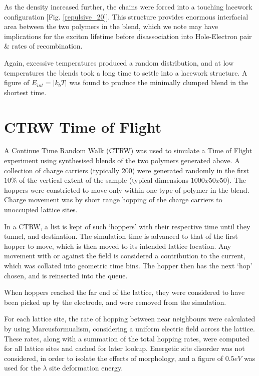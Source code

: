 \documentclass[twocolumn,a4,notitlepage]{article}
\begin{document}
As the density increased further, the chains were forced into a touching
lacework configuration [Fig. \ref{repulsive_20}]. 
This structure provides enormous interfacial area between the two
polymers in the blend, which we note may have implications for the exciton
lifetime before disassociation into Hole-Electron pair \& rates of
recombination.

Again, excessive temperatures produced a random distribution, and at low
temperatures the blends took a long time to settle into a lacework
structure. A figure of $E_{int} = |k_b T|$ was found to produce the minimally
clumped blend in the shortest time.

\section{CTRW Time of Flight}

A Continue Time Random Walk (CTRW) was used to simulate a Time of Flight
experiment using synthesised blends of the two polymers generated above. A
collection of charge carriers (typically 200) were generated randomly in the first $10\%$ of
the vertical extent of the sample (typical dimensions $1000x50x50$). The
hoppers were constricted to move only within one type of polymer in the
blend. Charge movement was by short range hopping of the charge carriers to
unoccupied lattice sites.

In a CTRW, a list is kept of such `hoppers' with their respective time until they
tunnel, and destination. The simulation time is advanced to that of the
first hopper to move, which is then moved to its intended lattice location.
Any movement with or against the field is considered a contribution to the
current, which was collated into geometric time bins. The hopper then has
the next `hop' chosen, and is reinserted into the queue.

When hoppers reached the far end of the lattice, they were considered to
have been picked up by the electrode, and were removed from the simulation.

For each lattice site, the rate of hopping between near neighbours were
calculated by using Marcusformualism, considering a uniform electric
field across the lattice. These rates, along with a
summation of the total hopping rates, were computed for all lattice sites
and cached for later lookup. Energetic site disorder was
not considered, in order to isolate the effects of morphology, and a figure
of $0.5eV$ was used for the $\lambda$ site deformation energy.
\end{document}
